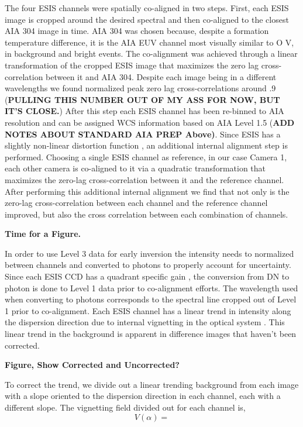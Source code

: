         The four ESIS channels were spatially co-aligned in two steps.  
        First, each ESIS image is cropped around the desired spectral and then co-aligned to the closest AIA 304 image in time.  
        AIA 304 was chosen because, despite a formation temperature difference, it is the AIA EUV channel most visually similar to O V, in background and bright events.
        The co-alignment was achieved through a linear transformation of the cropped ESIS image that maximizes the zero lag cross-correlation between it and AIA 304.
        Despite each image being in a different wavelengths we found normalized peak zero lag cross-correlations around .9 (\textbf{PULLING THIS NUMBER OUT OF MY ASS FOR NOW, BUT IT'S CLOSE.})
        After this step each ESIS channel has been re-binned to AIA resolution and can be assigned WCS information based on AIA Level 1.5 (\textbf{ADD NOTES ABOUT STANDARD AIA PREP Above)}.
        Since ESIS has a slightly non-linear distortion function \citep{ESIS}, an additional internal alignment step is performed.
        Choosing a single ESIS channel as reference, in our case Camera 1, each other camera is co-aligned to it via a quadratic transformation that maximizes the zero-lag cross-correlation between it and the reference channel.
        After performing this additional internal alignment we find that not only is the zero-lag cross-correlation between each channel and the reference channel improved, but also the cross correlation between each combination of channels.
        
        \textbf{Time for a Figure.}
        
        In order to use Level 3 data for early inversion the intensity needs to normalized between channels and converted to photons to properly account for uncertainty.
        Since each ESIS CCD has a quadrant specific gain \citep{ESIS}, the conversion from DN to photon is done to Level 1 data prior to co-alignment efforts.
        The wavelength used when converting to photons corresponds to the spectral line cropped out of Level 1 prior to co-alignment.
        Each ESIS channel has a linear trend in intensity along the dispersion direction due to internal vignetting in the optical system \citep{ESIS}.
        This linear trend in the background is apparent in difference images that haven't been corrected.
        
        \textbf{Figure, Show Corrected and Uncorrected?}
        
        To correct the trend, we divide out a linear trending background from each image with a slope oriented to the dispersion direction in each channel, each with a different slope.
        The vignetting field divided out for each channel is,
            \begin{equation}
                \label{eqn:vignet}
                V(\alpha) = 
            \end{equation}
        
